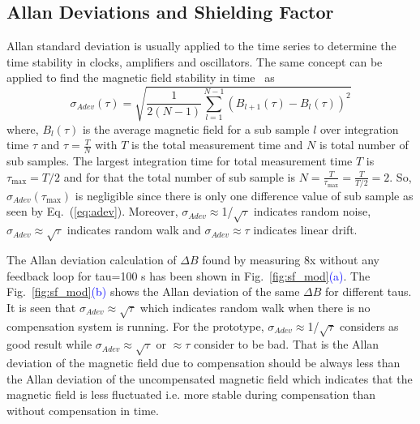  \subsection{Allan Deviations and Shielding Factor}
 
Allan standard deviation \cite{allan} is usually applied to the time series to determine the time stability in clocks, amplifiers and oscillators. The same concept can be applied to find the magnetic field stability in time~\cite{bea} as
\begin{equation}\label{eq:adev}
    \sigma_{Adev} (\tau)=\sqrt{\frac{1}{2(N-1)}\sum_{l=1}^{N-1} \left(B_{l+1}(\tau)-B_l(\tau)\right)^2}
\end{equation}
where, $B_l(\tau)$ is the average magnetic field for a sub sample $l$ over integration time $\tau$ and $\tau = \frac{T}{N}$ with $T$ is the total measurement time and $N$ is total number of sub samples. The largest integration time for total measurement time $T$ is $\tau_{\text{max}}=T/2$ and for that the total number of sub sample is $N = \frac{T}{\tau_{\text{max}}}=\frac{T}{T/2}=2$. So, $\sigma_{Adev}(\tau_{\text{max}})$ is negligible since there is only one difference value of sub sample as seen by Eq.~(\ref{eq:adev}). Moreover, $\sigma_{Adev}\approx$1/$\sqrt{\tau}$ indicates random noise, $\sigma_{Adev}\approx \sqrt{\tau}$ indicates random walk and $\sigma_{Adev}\approx \tau$ indicates linear drift. 

The Allan deviation calculation of $\Delta B$ found by measuring 8x without any feedback loop for tau=100 s has been shown in Fig.~\ref{fig:sf_mod}\textcolor{blue}{(a)}. The Fig.~\ref{fig:sf_mod}\textcolor{blue}{(b)} shows the Allan deviation of the same $\Delta B$ for different taus.  It is seen that $\sigma_{Adev}\approx \sqrt{\tau}$ which indicates random walk when there is no compensation system is running. For the prototype, $\sigma_{Adev}\approx$1/$\sqrt{\tau}$ considers as good result while $\sigma_{Adev}\approx \sqrt{\tau}$ or $\approx \tau$ consider to be bad. That is the Allan deviation of the magnetic field due to compensation should be always less than the Allan deviation of the uncompensated magnetic field which indicates that the magnetic field is less fluctuated i.e. more stable during compensation than without compensation in time. 

